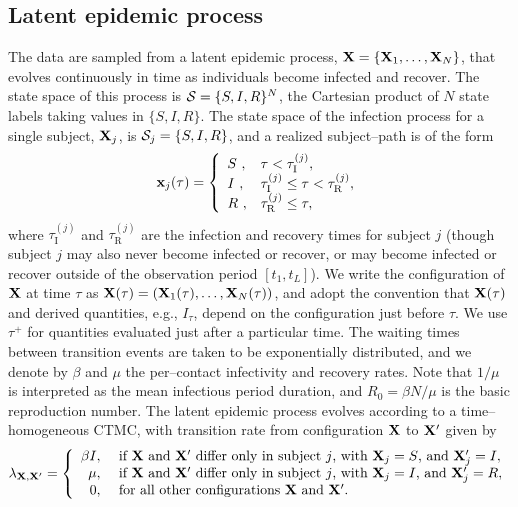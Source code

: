 \subsection{Latent epidemic process}
\label{subsec:bda_pop_proc}
The data are sampled from a latent epidemic process, $ \mathbf{X} = \lbrace \mathbf{X}_1,\dots,\mathbf{X}_N\rbrace $, that evolves continuously in time  as individuals become infected and recover. The state space of this process is $ \mathcal{S} = \lbrace S,I,R\rbrace^N $, the Cartesian product of $ N $ state labels taking values in $ \lbrace S,I,R\rbrace $. The state space of the infection process for a single subject, $ \mathbf{X}_j $, is $\mathcal{S}_j = \lbrace S, I, R\rbrace $, and a realized subject--path is of the form 
\begin{equation} \mathbf{x}_j(\tau) = \left \lbrace \begin{array}{ll}
S\ ,& \tau < \tau^{(j)}_{\mathrm{I}},\\
I\ ,& \tau^{(j)}_{\mathrm{I}} \leq \tau < \tau^{(j)}_{\mathrm{R}},\\
R\ ,& \tau^{(j)}_{\mathrm{R}} \leq \tau,
\end{array} \right . \end{equation} 
where $ \tau^{(j)}_{\mathrm{I}} $ and $ \tau^{(j)}_{\mathrm{R}} $ are the infection and recovery times for subject $ j $ (though subject $ j $ may also never become infected or recover, or may become infected or recover outside of the observation period $ [t_1,t_L] $). We write the configuration of $ \mathbf{X} $ at time $ \tau $ as $ \mathbf{X}(\tau) = \left (\mathbf{X}_1(\tau),\dots,\mathbf{X}_N(\tau)\right ) $, and adopt the convention that $ \mathbf{X}(\tau) $ and derived quantities, e.g., $ I_\tau $, depend on the configuration just before $ \tau $. We  use $ \tau^+ $ for quantities evaluated just after a particular time. The waiting times between transition events are taken to be exponentially distributed, and we denote by $ \beta $ and $ \mu $ the per--contact infectivity and recovery rates. Note that $ 1/\mu $ is interpreted as the mean infectious period duration, and $ R_0=\beta N/\mu $ is the basic reproduction number. The latent epidemic process evolves according to a time--homogeneous CTMC, with transition rate from configuration $ \mathbf{X} $ to $ \mathbf{X}^\prime $ given by
\begin{equation}
\lambda_{\mathbf{X},\mathbf{X}^\prime} = \left \lbrace \begin{array}{rl}
\beta I,\ &\text{if } \mathbf{X}\ \text{and } \mathbf{X}^\prime\ \text{differ only in subject }j \text{, with }\mathbf{X}_j=S\text{, and }\mathbf{X}_j^\prime=I,\\
\mu,\ &\text{if } \mathbf{X}\ \text{and } \mathbf{X}^\prime\ \text{differ only in subject }j \text{, with }\mathbf{X}_j=I\text{, and }\mathbf{X}_j^\prime=R,\\
0,\ & \text{for all other configurations }\mathbf{X}\ \text{and }\mathbf{X}^\prime.
\end{array}\right.
\end{equation}
